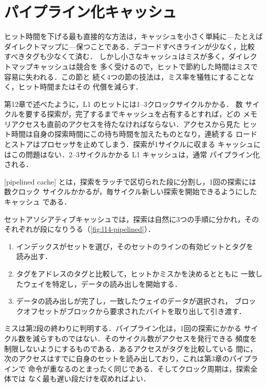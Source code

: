 \documentclass[../main.tex]{subfiles}
\begin{document}
\section{パイプライン化キャッシュ}
\label{sec:l14-pipelined}

ヒット時間を下げる最も直接的な方法は，キャッシュを小さく単純に---たとえば
ダイレクトマップに---保つことである．デコードすべきラインが少なく，比較
すべきタグも少なくて済む．
しかし小さなキャッシュはミスが多く，ダイレクトマップキャッシュは競合を
多く受けるので，ヒットで節約した時間はミスで容易に失われる．この節と
続く4つの節の技法は，ミス率を犠牲にすることなく，ヒット時間またはその
代償を減らす．

第12章で述べたように，L1 のヒットには1--3クロックサイクルかかる．
数
サイクルを要する探索が，完了するまでキャッシュを占有するとすれば，どの
メモリアクセスも直前のアクセスを待たなければならない．アクセスから見た
ヒット時間は自身の探索時間にこの待ち時間を加えたものとなり，連続する
ロードとストアはプロセッサを止めてしまう．探索が1サイクルに収まる
キャッシュにはこの問題はない．2--3サイクルかかる L1 キャッシュは，通常
パイプライン化される．

\begin{definition}[パイプライン化キャッシュ]
  [pipelined cache]%
  とは，探索をラッチで区切られた段に分割し，1回の探索には数クロック
  サイクルかかるが，毎サイクル新しい探索を開始できるようにしたキャッシュ
  である．
\end{definition}

セットアソシアティブキャッシュでは，探索は自然に3つの手順に分かれ，その
それぞれが段になりうる（\cref{fig:l14-pipelined}）．
\begin{enumerate}
  \item インデックスがセットを選び，そのセットのラインの有効ビットとタグを
    読み出す．
  \item タグをアドレスのタグと比較して，ヒットかミスかを決めるとともに
    一致したウェイを特定し，データの読み出しを開始する．
  \item データの読み出しが完了し，一致したウェイのデータが選択され，
    ブロックオフセットがブロックから要求されたバイトを取り出して引き渡す．
\end{enumerate}
ミスは第2段の終わりに判明する．パイプライン化は，1回の探索にかかる
サイクル数を減らすものではない．そのサイクル数がアクセスを発行できる
頻度を制限しないようにするものである．あるアクセスがタグを比較している
間に，次のアクセスはすでに自身のセットを読み出しており，これは第3章のパイプラインで
命令が重なるのとまったく同じである．そしてクロック周期は，探索全体では
なく最も遅い段だけを収めればよい．
\end{document}
